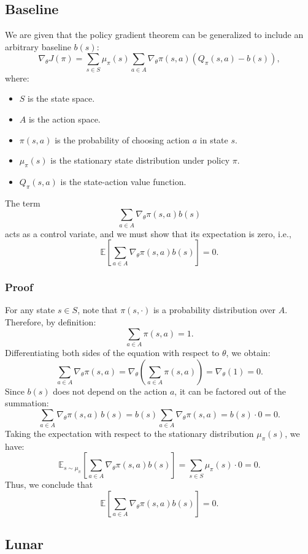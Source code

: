 \subsection{Baseline}

We are given that the policy gradient theorem can be generalized to include an arbitrary baseline $b(s)$:
\[
\nabla_\theta J(\pi) = \sum_{s \in S} \mu_\pi(s) \sum_{a \in A} \nabla_\theta \pi(s,a) \left( Q_\pi(s,a) - b(s) \right),
\]
where:
\begin{itemize}
    \item $S$ is the state space.
    \item $A$ is the action space.
    \item $\pi(s,a)$ is the probability of choosing action $a$ in state $s$.
    \item $\mu_\pi(s)$ is the stationary state distribution under policy $\pi$.
    \item $Q_\pi(s,a)$ is the state-action value function.
\end{itemize}
The term 
\[
\sum_{a \in A} \nabla_\theta \pi(s,a) b(s)
\]
acts as a control variate, and we must show that its expectation is zero, i.e.,
\[
\mathbb{E}\!\left[ \sum_{a \in A} \nabla_\theta \pi(s,a)b(s) \right] = 0.
\]

\subsubsection*{Proof}

For any state $s\in S$, note that $\pi(s,\cdot)$ is a probability distribution over $A$. Therefore, by definition:
\[
\sum_{a \in A} \pi(s,a) = 1.
\]
Differentiating both sides of the equation with respect to $\theta$, we obtain:
\[
\sum_{a \in A} \nabla_\theta \pi(s,a) = \nabla_\theta \left( \sum_{a \in A} \pi(s,a) \right) = \nabla_\theta (1) = 0.
\]
Since $b(s)$ does not depend on the action $a$, it can be factored out of the summation:
\[
\sum_{a \in A} \nabla_\theta \pi(s,a) \, b(s) = b(s) \sum_{a \in A} \nabla_\theta \pi(s,a) = b(s) \cdot 0 = 0.
\]
Taking the expectation with respect to the stationary distribution $\mu_\pi(s)$, we have:
\[
\mathbb{E}_{s\sim\mu_\pi}\!\left[ \sum_{a \in A} \nabla_\theta \pi(s,a)b(s) \right] = \sum_{s \in S} \mu_\pi(s) \cdot 0 = 0.
\]
Thus, we conclude that
\[
\mathbb{E}\!\left[ \sum_{a \in A} \nabla_\theta \pi(s,a)b(s) \right] = 0.
\]


\subsection{Lunar}

